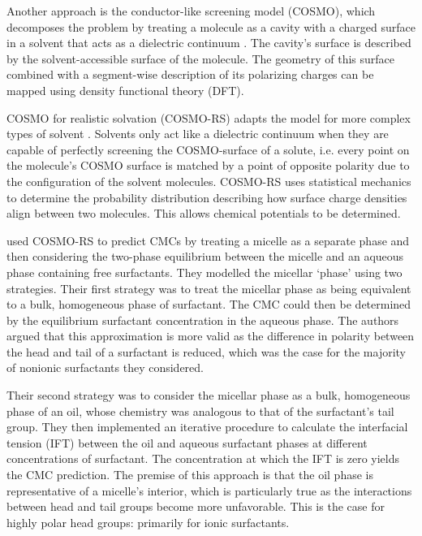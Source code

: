 Another approach is the conductor-like screening model (COSMO), which decomposes
the problem by treating a molecule as a cavity with a charged surface in a
solvent that acts as a dielectric continuum \cite{klamtCOSMONewApproach1993}.
The cavity's surface is described by the solvent-accessible surface of the
molecule. The geometry of this surface combined with a segment-wise description
of its polarizing charges can be mapped using density functional theory (DFT).

COSMO for realistic solvation (COSMO-RS) adapts the model for more complex types
of solvent \cite{klamtCOSMORSAlternativeSimulation2010}. Solvents only act like
a dielectric continuum when they are capable of perfectly screening the
COSMO-surface of a solute, i.e. every point on the molecule's COSMO surface is
matched by a point of opposite polarity due to the configuration of the solvent
molecules. COSMO-RS uses statistical mechanics to determine the probability
distribution describing how surface charge densities align between two
molecules. This allows chemical potentials to be determined.

\citet{turchiFirstprinciplesPredictionCritical2022} used COSMO-RS to predict
CMCs by treating a micelle as a separate phase and then considering the
two-phase equilibrium between the micelle and an aqueous phase containing free
surfactants. They modelled the micellar `phase' using two strategies. Their
first strategy was to treat the micellar phase as being equivalent to a bulk,
homogeneous phase of surfactant. The CMC could then be determined by the
equilibrium surfactant concentration in the aqueous phase. The authors argued
that this approximation is more valid as the difference in polarity between the
head and tail of a surfactant is reduced, which was the case for the majority of
nonionic surfactants they considered.

Their second strategy was to consider the micellar phase as a bulk, homogeneous
phase of an oil, whose chemistry was analogous to that of the surfactant's tail
group. They then implemented an iterative procedure to calculate the interfacial
tension (IFT) between the oil and aqueous surfactant phases at different
concentrations of surfactant. The concentration at which the IFT is zero yields
the CMC prediction. The premise of this approach is that the oil phase is
representative of a micelle's interior, which is particularly true as the
interactions between head and tail groups become more unfavorable. This is the
case for highly polar head groups: primarily for ionic surfactants.

